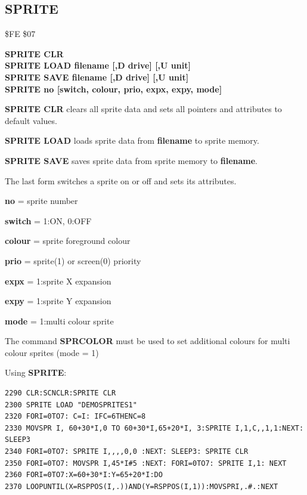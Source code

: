 \subsection{SPRITE}
\begin{description}[leftmargin=2cm,style=nextline]
\item [Token:] \$FE \$07
\item [Format:] {\bf SPRITE CLR} \\
                {\bf SPRITE LOAD filename [,D drive] [,U unit]} \\
                {\bf SPRITE SAVE filename [,D drive] [,U unit]} \\
                {\bf SPRITE no [switch, colour, prio, expx, expy, mode]}
\item [Usage:]  {\bf SPRITE CLR} clears all sprite data and sets all pointers
                and attributes to default values.

                {\bf SPRITE LOAD } loads sprite data from {\bf filename}
                to sprite memory.

                {\bf SPRITE SAVE } saves sprite data from
                sprite memory to {\bf filename}.

                \filenamedefinition

                The last form switches a sprite on or off and sets its attributes.

                {\bf no} = sprite number

                {\bf switch} = 1:ON, 0:OFF

                {\bf colour} = sprite foreground colour

                {\bf prio} = sprite(1) or screen(0) priority

                {\bf expx} = 1:sprite X expansion

                {\bf expy} = 1:sprite Y expansion

                {\bf mode} = 1:multi colour sprite

\item [Remarks:] The command {\bf SPRCOLOR} must be used to set
                additional colours
                for multi colour sprites (mode = 1)

\item [Example:] Using {\bf SPRITE}:
\begin{tcolorbox}[colback=black,coltext=white]
\verbatimfont{\codefont}
\begin{verbatim}
2290 CLR:SCNCLR:SPRITE CLR
2300 SPRITE LOAD "DEMOSPRITES1"
2320 FORI=0TO7: C=I: IFC=6THENC=8
2330 MOVSPR I, 60+30*I,0 TO 60+30*I,65+20*I, 3:SPRITE I,1,C,,1,1:NEXT: SLEEP3
2340 FORI=0TO7: SPRITE I,,,,0,0 :NEXT: SLEEP3: SPRITE CLR
2350 FORI=0TO7: MOVSPR I,45*I#5 :NEXT: FORI=0TO7: SPRITE I,1: NEXT
2360 FORI=0TO7:X=60+30*I:Y=65+20*I:DO
2370 LOOPUNTIL(X=RSPPOS(I,.))AND(Y=RSPPOS(I,1)):MOVSPRI,.#.:NEXT
\end{verbatim}
\end{tcolorbox}
\end{description}

